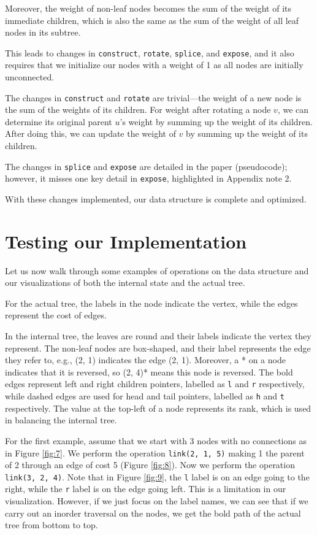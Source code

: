 \documentclass[a4paper, 11pt]{article}
\begin{document}
Moreover, the weight of non-leaf nodes becomes the sum of the weight of its immediate children, which is also the same as the sum of the weight of all leaf nodes in its subtree.

This leads to changes in \texttt{construct}, \texttt{rotate}, \texttt{splice}, and \texttt{expose}, and it also requires that we initialize our nodes with a weight of 1 as all nodes are initially unconnected.

The changes in \texttt{construct} and \texttt{rotate} are trivial—the weight of a new node is the sum of the weights of its children. For weight after rotating a node \(v\), we can determine its original parent \(u\)'s weight by summing up the weight of its children. After doing this, we can update the weight of \(v\) by summing up the weight of its children.

The changes in \texttt{splice} and \texttt{expose} are detailed in the paper (pseudocode); however, it misses one key detail in \texttt{expose}, highlighted in Appendix note 2.

With these changes implemented, our data structure is complete and optimized.


\pagebreak

\section{Testing our Implementation}

Let us now walk through some examples of operations on the data structure and our visualizations of both the internal state and the actual tree.

For the actual tree, the labels in the node indicate the vertex, while the edges represent the cost of edges.

In the internal tree, the leaves are round and their labels indicate the vertex they represent. The non-leaf nodes are box-shaped, and their label represents the edge they refer to, e.g., (2, 1) indicates the edge (2, 1). Moreover, a * on a node indicates that it is reversed, so (2, 4)* means this node is reversed. The bold edges represent left and right children pointers, labelled as \texttt{l} and \texttt{r} respectively, while dashed edges are used for head and tail pointers, labelled as \texttt{h} and \texttt{t} respectively. The value at the top-left of a node represents its rank, which is used in balancing the internal tree.

For the first example, assume that we start with 3 nodes with no connections as in Figure \ref{fig:7}. We perform the operation \texttt{link(2, 1, 5)} making 1 the parent of 2 through an edge of cost 5 (Figure \ref{fig:8}). Now we perform the operation \texttt{link(3, 2, 4)}. Note that in Figure \ref{fig:9}, the \texttt{l} label is on an edge going to the right, while the \texttt{r} label is on the edge going left. This is a limitation in our visualization. However, if we just focus on the label names, we can see that if we carry out an inorder traversal on the nodes, we get the bold path of the actual tree from bottom to top.
\end{document}
